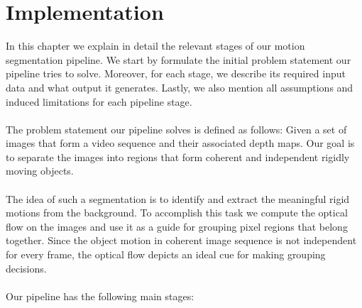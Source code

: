 \chapter{Implementation}


In this chapter we explain in detail the relevant stages of our motion segmentation pipeline. We start by formulate the initial problem statement our pipeline tries to solve. Moreover, for each stage, we describe its required input data and what output it generates. Lastly, we also mention all assumptions and induced limitations for each pipeline stage. \\ \\
The problem statement our pipeline solves is defined as follows: 
Given a set of images that form a video sequence and their associated depth maps. Our goal is to separate the images into regions that form coherent and independent rigidly moving objects. \\ \\
The idea of such a segmentation is to identify and extract the meaningful rigid motions from the background. To accomplish this task we compute the optical flow on the images and use it as a guide for grouping pixel regions that belong together. Since the object motion in coherent image sequence is not independent for every frame, the optical flow depicts an ideal cue for making grouping decisions. \\ \\
Our pipeline has the following main stages:

